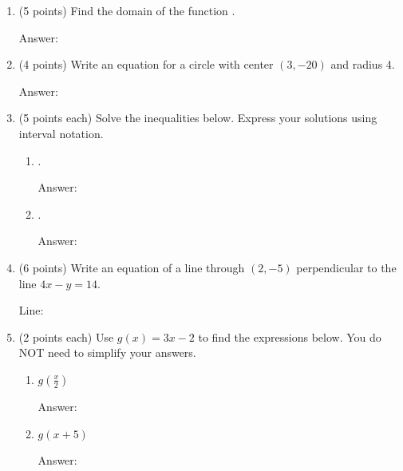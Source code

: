 \documentclass[12pt]{article}
\begin{document}
\begin{enumerate}
\item (5 points) Find the domain of the function .\\
\begin{flushright}{ Answer:\underline{\hspace{2in}}}\end{flushright}
\vfill
\newpage
\item (4 points) Write an equation for a circle with center $(3,-20)$ and radius 4.
\begin{flushright}{ Answer:\underline{\hspace{2in}}}\end{flushright}
\vspace{.3in}
\item (5 points each) Solve the inequalities below. Express your solutions using interval notation.
\begin{enumerate}
\item  \scalebox{1.2}{$15-\vert 3x+1 \vert > 2$}.
\begin{flushright}{ Answer:\underline{\hspace{2in}}}\end{flushright}
\vfill
\item  {}.
\begin{flushright}{ Answer:\underline{\hspace{2in}}}\end{flushright}
\vfill
\end{enumerate}
\item (6 points) Write an equation of a line through $(2,-5)$ perpendicular to the line $4x-y=14.$ \begin{flushright}{ Line:\underline{\hspace{2in}}}\end{flushright}
\vfill
\newpage	
\item (2 points each) Use $g(x)=3x-2$ to find the expressions below. You do NOT need to simplify your answers.
\begin{enumerate}
\item $g(\frac{x}{2})$\\ 
\begin{flushright}{ Answer:\underline{\hspace{2in}}}\end{flushright}
\item $g(x+5)$\\
\begin{flushright}{ Answer:\underline{\hspace{2in}}}\end{flushright}
\end{enumerate}


\end{enumerate}
\end{document}
